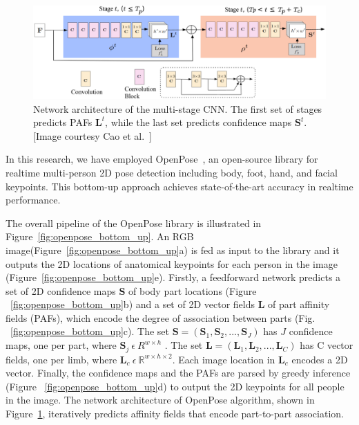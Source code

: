 \begin{figure}
	\centering
	\includegraphics[width=\textwidth]{figures/openpose_architecture.eps}
	\caption[Network architecture of the multi-stage CNN]
	{Network architecture  of  the  multi-stage  CNN.  The  first  set of stages predicts PAFs $\textbf{L}^t$, while the last set predicts confidence  maps $ \textbf{S}^{t}$. [Image courtesy Cao et al.~\cite{Cao_19}] \label{fig:openpose_architecture}}
\end{figure}

In this research, we have employed OpenPose~\cite{Cao_19}, an open-source library for realtime multi-person 2D pose detection including body, foot, hand, and facial keypoints. This bottom-up approach achieves state-of-the-art accuracy in realtime performance. 

The overall pipeline of the OpenPose library is illustrated in Figure~\ref{fig:openpose_bottom_up}. An RGB image(Figure~\ref{fig:openpose_bottom_up}a) is fed as input to the library and it outputs the 2D locations of anatomical keypoints for each person in the image (Figure~\ref{fig:openpose_bottom_up}e). Firstly, a feedforward network predicts a set of 2D confidence maps \textbf{S} of body part locations (Figure ~\ref{fig:openpose_bottom_up}b) and a set of 2D vector fields \textbf{L} of part affinity fields (PAFs), which encode the degree of association between parts (Fig. ~\ref{fig:openpose_bottom_up}c). The set $\textbf{S} = (\textbf{S}_1,\textbf{S}_2,...,\textbf{S}_J)$ has $ J $ confidence maps, one per part, where $\textbf{S}_j~\epsilon \mathbb~{R}^{w\times h}$ . The set $\textbf{L}= (\textbf{L}_1,\textbf{L}_2,...,\textbf{L}_C)$ has C vector fields, one per limb, where $\textbf{L}_c~\epsilon~\mathbb {R}^{w\times h\times 2}$. Each image location in $\textbf{L}_c$ encodes a 2D vector. Finally, the confidence maps and the PAFs are parsed by greedy inference (Figure ~\ref{fig:openpose_bottom_up}d) to output the 2D keypoints for all people in the image. The network architecture of OpenPose algorithm, shown in Figure~\ref{fig:openpose_architecture}, iteratively predicts affinity fields that  encode part-to-part association.
